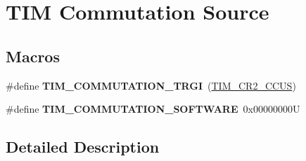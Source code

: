 \hypertarget{group___t_i_m___commutation___source}{}\section{T\+IM Commutation Source}
\label{group___t_i_m___commutation___source}
\subsection*{Macros}
\begin{DoxyCompactItemize}
\item 
\mbox{\label{group___t_i_m___commutation___source_gab2e11763b5e061a5b3056ac970f57ab1}} 
\#define {\bfseries T\+I\+M\+\_\+\+C\+O\+M\+M\+U\+T\+A\+T\+I\+O\+N\+\_\+\+T\+R\+GI}~(\mbox{\hyperlink{group___peripheral___registers___bits___definition_gaf0328c1339b2b1633ef7a8db4c02d0d5}{T\+I\+M\+\_\+\+C\+R2\+\_\+\+C\+C\+US}})
\item 
\mbox{\label{group___t_i_m___commutation___source_ga9cd117a69cbca219c1cf29e74746a496}} 
\#define {\bfseries T\+I\+M\+\_\+\+C\+O\+M\+M\+U\+T\+A\+T\+I\+O\+N\+\_\+\+S\+O\+F\+T\+W\+A\+RE}~0x00000000U
\end{DoxyCompactItemize}


\subsection{Detailed Description}
